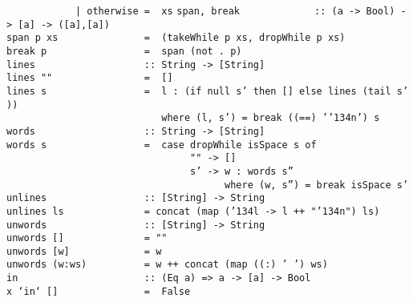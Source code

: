\mbox{\tt \ \ \ \ \ \ \ \ \ \ \ \ |\ otherwise\ =\ \ xs}
%
\eprogB\noindent\bprogB
\mbox{\tt span,\ break\ \ \ \ \ \ \ \ \ \ \ \ \ ::\ (a\ ->\ Bool)\ ->\ [a]\ ->\ ([a],[a])}\\
\mbox{\tt span\ p\ xs\ \ \ \ \ \ \ \ \ \ \ \ \ \ \ =\ \ (takeWhile\ p\ xs,\ dropWhile\ p\ xs)}\\
\mbox{\tt break\ p\ \ \ \ \ \ \ \ \ \ \ \ \ \ \ \ \ =\ \ span\ (not\ .\ p)}
%
%
\eprogB\noindent\bprogB
\mbox{\tt lines\ \ \ \ \ \ \ \ \ \ \ \ \ \ \ \ \ \ \ ::\ String\ ->\ [String]}\\
\mbox{\tt lines\ ""\ \ \ \ \ \ \ \ \ \ \ \ \ \ \ \ =\ \ []}\\
\mbox{\tt lines\ s\ \ \ \ \ \ \ \ \ \ \ \ \ \ \ \ \ =\ \ l\ :\ (if\ null\ s'\ then\ []\ else\ lines\ (tail\ s'))}\\
\mbox{\tt \ \ \ \ \ \ \ \ \ \ \ \ \ \ \ \ \ \ \ \ \ \ \ \ \ \ \ where\ (l,\ s')\ =\ break\ ((==)\ '{\char'134}n')\ s}
%
\eprogB\noindent\bprogB
\mbox{\tt words\ \ \ \ \ \ \ \ \ \ \ \ \ \ \ \ \ \ \ ::\ String\ ->\ [String]}\\
\mbox{\tt words\ s\ \ \ \ \ \ \ \ \ \ \ \ \ \ \ \ \ =\ \ case\ dropWhile\ isSpace\ s\ of}\\
\mbox{\tt \ \ \ \ \ \ \ \ \ \ \ \ \ \ \ \ \ \ \ \ \ \ \ \ \ \ \ \ \ \ \ \ ""\ ->\ []}\\
\mbox{\tt \ \ \ \ \ \ \ \ \ \ \ \ \ \ \ \ \ \ \ \ \ \ \ \ \ \ \ \ \ \ \ \ s'\ ->\ w\ :\ words\ s''}\\
\mbox{\tt \ \ \ \ \ \ \ \ \ \ \ \ \ \ \ \ \ \ \ \ \ \ \ \ \ \ \ \ \ \ \ \ \ \ \ \ \ \ where\ (w,\ s'')\ =\ break\ isSpace\ s'}
%
\eprogB\noindent\bprogB
\mbox{\tt unlines\ \ \ \ \ \ \ \ \ \ \ \ \ \ \ \ \ ::\ [String]\ ->\ String}\\
\mbox{\tt unlines\ ls\ \ \ \ \ \ \ \ \ \ \ \ \ \ =\ concat\ (map\ ({\char'134}l\ ->\ l\ ++\ "{\char'134}n")\ ls)}
%
\eprogB\noindent\bprogB
\mbox{\tt unwords\ \ \ \ \ \ \ \ \ \ \ \ \ \ \ \ \ ::\ [String]\ ->\ String}\\
\mbox{\tt unwords\ []\ \ \ \ \ \ \ \ \ \ \ \ \ \ =\ ""}\\
\mbox{\tt unwords\ [w]\ \ \ \ \ \ \ \ \ \ \ \ \ =\ w}\\
\mbox{\tt unwords\ (w:ws)\ \ \ \ \ \ \ \ \ \ =\ w\ ++\ concat\ (map\ ((:)\ '\ ')\ ws)}
%
\eprogB\noindent\bprogB
\mbox{\tt in\ \ \ \ \ \ \ \ \ \ \ \ \ \ \ \ \ \ \ \ \ \ ::\ (Eq\ a)\ =>\ a\ ->\ [a]\ ->\ Bool}\\
\mbox{\tt x\ `in`\ []\ \ \ \ \ \ \ \ \ \ \ \ \ \ \ =\ \ False}\\
